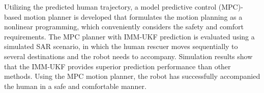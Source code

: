 \documentclass[letterpaper, 10 pt, conference]{ieeeconf}
\begin{document}
	Utilizing the predicted human trajectory, a model predictive control (MPC)-based motion planner is developed that formulates the motion planning as a nonlinear programming, which conveniently considers the safety and comfort requirements.
	The MPC planner with IMM-UKF prediction is evaluated using a simulated SAR scenario, in which the human rescuer moves sequentially to several destinations and the robot needs to accompany. 
	Simulation results show that the IMM-UKF provides superior prediction performance than other methods.
	Using the MPC motion planner, the robot has successfully accompanied the human in a safe and comfortable manner.
\end{document}
